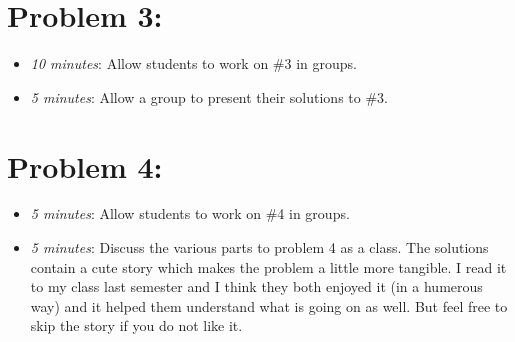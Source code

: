 \documentclass[handout,nooutcomes]{ximera}
\begin{document}
	
	
\section*{Problem 3:}

	\begin{itemize}
	
	\item  \emph{10 minutes}:  Allow students to work on \#3 in groups.  
	
	\item  \emph{5 minutes}:  Allow a group to present their solutions to \#3.
	
	\end{itemize}
	


\section*{Problem 4:}

	\begin{itemize}
	
	\item  \emph{5 minutes}:  Allow students to work on \#4 in groups.  
		
	\item  \emph{5 minutes}:  Discuss the various parts to problem 4 as a class.  The solutions contain a cute story which makes the problem a little more tangible.  I read it to my class last semester and I think they both enjoyed it (in a humerous way) and it helped them understand what is going on as well.  But feel free to skip the story if you do not like it.	
	\end{itemize}	
	
	
	

	
	

	
	
	

	
	
	
\end{document}
